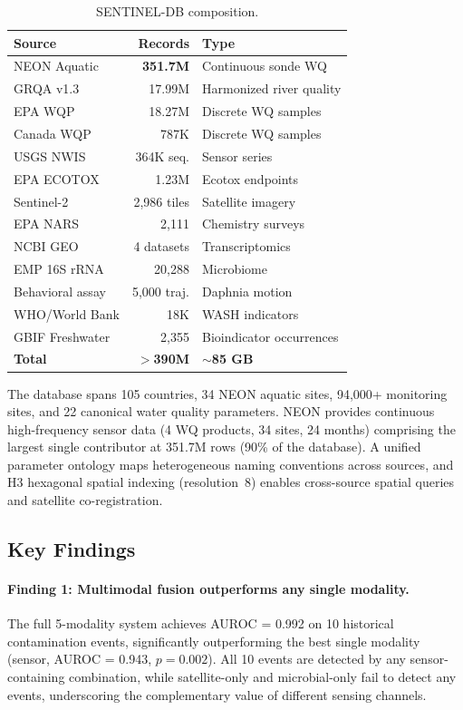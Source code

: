 \begin{table}[t]
\centering
\caption{SENTINEL-DB composition.}
\label{tab:sentinel_db}
\small
\begin{tabular}{lrl}
\toprule
\textbf{Source} & \textbf{Records} & \textbf{Type} \\
\midrule
NEON Aquatic & \textbf{351.7M} & Continuous sonde WQ \\
GRQA v1.3 & 17.99M & Harmonized river quality \\
EPA WQP & 18.27M & Discrete WQ samples \\
Canada WQP & 787K & Discrete WQ samples \\
USGS NWIS & 364K seq. & Sensor series \\
EPA ECOTOX & 1.23M & Ecotox endpoints \\
Sentinel-2 & 2,986 tiles & Satellite imagery \\
EPA NARS & 2,111 & Chemistry surveys \\
NCBI GEO & 4 datasets & Transcriptomics \\
EMP 16S rRNA & 20,288 & Microbiome \\
Behavioral assay & 5,000 traj. & Daphnia motion \\
WHO/World Bank & 18K & WASH indicators \\
GBIF Freshwater & 2,355 & Bioindicator occurrences \\
\midrule
\textbf{Total} & \textbf{$>$390M} & \textbf{$\sim$85 GB} \\
\bottomrule
\end{tabular}
\end{table}

The database spans 105 countries, 34 NEON aquatic sites, 94,000+ monitoring
sites, and 22 canonical water quality parameters. NEON provides continuous
high-frequency sensor data (4 WQ products, 34 sites, 24 months) comprising
the largest single contributor at 351.7M rows (90\% of the database). A unified
parameter ontology maps heterogeneous naming conventions across sources, and
H3 hexagonal spatial indexing (resolution~8) enables cross-source spatial
queries and satellite co-registration.

\subsection{Key Findings}

\paragraph{Finding 1: Multimodal fusion outperforms any single modality.}
The full 5-modality system achieves AUROC = 0.992 on 10 historical
contamination events, significantly outperforming the best single
modality (sensor, AUROC = 0.943, $p = 0.002$). All 10 events are
detected by any sensor-containing combination, while satellite-only
and microbial-only fail to detect any events, underscoring the
complementary value of different sensing channels.

